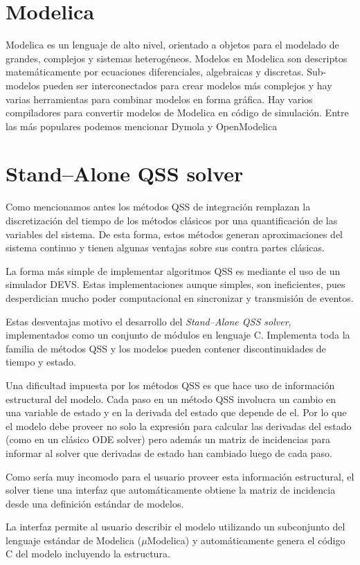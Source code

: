 \documentclass[a4paper,	11pt]{report}
\begin{document}
\section{Modelica}
Modelica es un lenguaje de alto nivel, orientado a objetos para el modelado de grandes, complejos y sistemas heterogéneos.
Modelos en Modelica son descriptos matemáticamente por ecuaciones diferenciales, algebraicas y discretas. Sub-modelos pueden ser interconectados para crear modelos más complejos y hay varias herramientas para combinar modelos en forma gráfica. 
Hay varios compiladores para convertir modelos de Modelica en código de simulación. Entre las más populares podemos mencionar Dymola y OpenModelica

\section{Stand–Alone QSS solver}
Como mencionamos antes los métodos QSS de integración remplazan la discretización del tiempo de los métodos clásicos por una quantificación de las variables del sistema. De esta forma, estos métodos generan aproximaciones del sistema continuo y tienen algunas ventajas sobre sus contra partes clásicas.

La forma más simple de implementar algoritmos QSS es mediante el uso de un simulador DEVS. Estas implementaciones aunque simples, son ineficientes, pues desperdician mucho poder computacional en sincronizar y transmisión de eventos.

Estas desventajas motivo el desarrollo del \emph{Stand–Alone QSS solver}, implementados como un conjunto de módulos en lenguaje C. Implementa toda la familia de métodos QSS y los modelos pueden contener discontinuidades de tiempo y estado.

Una dificultad impuesta por los métodos QSS es que hace uso de información estructural del modelo. Cada paso en un método QSS involucra un cambio en una variable de estado y en la derivada del estado que depende de el. Por lo que el modelo debe proveer no solo la expresión para calcular las derivadas del estado (como en un clásico ODE solver) pero además un matriz de incidencias para informar al solver que derivadas de estado han cambiado luego de cada paso.

Como sería muy incomodo para el usuario proveer esta información estructural, el solver tiene una interfaz que automáticamente obtiene la matriz de incidencia desde una definición estándar de modelos.

La interfaz permite al usuario describir el modelo utilizando un subconjunto del lenguaje estándar de Modelica ($\mu$Modelica) y automáticamente genera el código C del modelo incluyendo la estructura.
\end{document}

